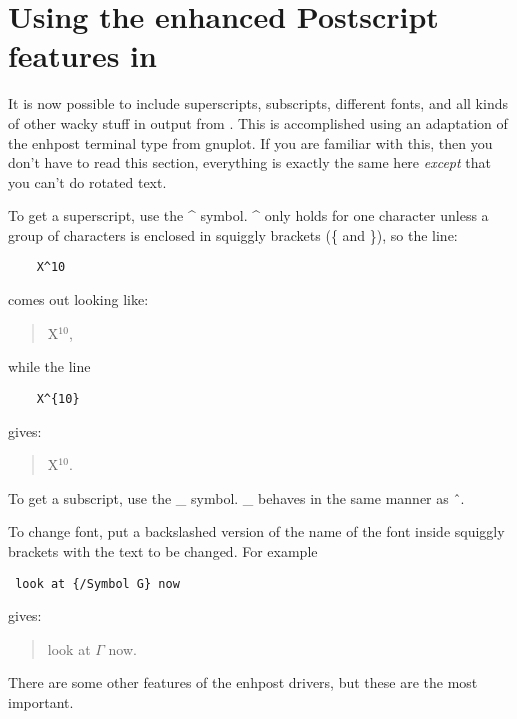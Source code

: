 \chapter{Using the enhanced Postscript features in \viewprog}

It is now possible to include superscripts, subscripts, different
fonts, and all kinds of other wacky stuff in output from \viewprog.
This is accomplished using an adaptation of the enhpost terminal type
from gnuplot.  If you are familiar with this, then you don't have to
read this section, everything is exactly the same here {\em except}
that you can't do rotated text.

To get a superscript, use the \^{} symbol.  \^{} only holds for one
character unless a group of characters is enclosed in squiggly
brackets (\{ and \}), so the line:
\begin{verbatim} 	X^10 \end{verbatim}
comes out looking like: 
\begin{quotation}
X$^10$,
\end{quotation}
while the line 
\begin{verbatim} 	X^{10} \end{verbatim} 
gives:
\begin{quotation}
X$^{10}$. 
\end{quotation}
To get a subscript, use the \_ symbol.  \_ behaves in the same manner
as \^\ . 

To change font, put a backslashed version of the name of the font
inside squiggly brackets with the text to be changed.  For example
\begin{verbatim} look at {/Symbol G} now \end{verbatim}  
gives: 
\begin{quotation}
look at $\Gamma$ now. 
\end{quotation}

There are some other features of the enhpost drivers, but these are
the most important.
